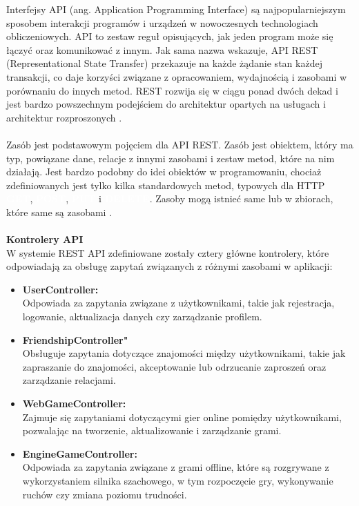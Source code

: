 \documentclass[twoside]{projektInzynierskiMS1}
\begin{document}
\noindent
Interfejsy API (ang. Application Programming Interface) są najpopularniejszym sposobem interakcji programów i urządzeń w nowoczesnych technologiach obliczeniowych. API to zestaw reguł opisujących, jak jeden program może się łączyć oraz komunikować z innym. Jak sama nazwa wskazuje, API REST (Representational State Transfer) przekazuje na każde żądanie stan każdej transakcji, co daje korzyści związane z opracowaniem, wydajnością i zasobami w porównaniu do innych metod. REST rozwija się w ciągu ponad dwóch dekad i jest bardzo powszechnym podejściem do architektur opartych na usługach i architektur rozproszonych \cite{RestApiOverview}.
\\\\
Zasób jest podstawowym pojęciem dla API REST. Zasób jest obiektem, który ma typ, powiązane dane, relacje z innymi zasobami i zestaw metod, które na nim działają. Jest bardzo podobny do idei obiektów w programowaniu, chociaż zdefiniowanych jest tylko kilka standardowych metod, typowych dla HTTP \textbf{\colorbox{cyan!90}{\textcolor{white}{GET}}}, \textbf{\colorbox{green!90}{\textcolor{white}{POST}}}, \textbf{\colorbox{orange!90}{\textcolor{white}{PUT}}} i \textbf{\colorbox{red!90}{\textcolor{white}{DELETE}}}. Zasoby mogą istnieć same lub w zbiorach, które same są zasobami \cite{RestApiOverview}.
\\\\

\noindent \textbf{Kontrolery API} \\
W systemie REST API zdefiniowane zostały cztery główne kontrolery, które odpowiadają za obsługę zapytań związanych z różnymi zasobami w aplikacji:

\begin{itemize}
    \item \textbf{UserController:}\\
    Odpowiada za zapytania związane z użytkownikami, takie jak rejestracja, logowanie, aktualizacja danych czy zarządzanie profilem.

    \item \textbf{FriendshipController"}\\
    Obsługuje zapytania dotyczące znajomości między użytkownikami, takie jak zapraszanie do znajomości, akceptowanie lub odrzucanie zaproszeń oraz zarządzanie relacjami.

    \item \textbf{WebGameController:}\\
    Zajmuje się zapytaniami dotyczącymi gier online pomiędzy użytkownikami, pozwalając na tworzenie, aktualizowanie i zarządzanie grami.

    \item \textbf{EngineGameController:}\\
    Odpowiada za zapytania związane z grami offline, które są rozgrywane z wykorzystaniem silnika szachowego, w tym rozpoczęcie gry, wykonywanie ruchów czy zmiana poziomu trudności.
\end{itemize}
\end{document}
